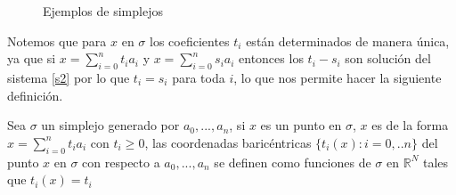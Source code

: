\begin{figure}[h]
\centering
{}
\caption{Ejemplos de simplejos}
\end{figure}

Notemos que para $x$ en $\sigma$ los coeficientes $t_i$ están determinados de manera única, ya que si $x = \sum_{i=0}^{n}t_ia_i$ y $x = \sum_{i=0}^{n}s_ia_i$ entonces los $t_i-s_i$ son solución del sistema \ref{s2} por lo que $t_i=s_i$ para toda $i$, lo que nos permite hacer la 
siguiente definición.
\begin{Defi}
Sea $\sigma$ un simplejo generado por $a_0,...,a_n$, si $x$ es un punto en $\sigma$, $x$ es de la forma $x = \sum_{i=0}^{n}t_ia_i$ con $t_i\geqslant 0$, las coordenadas baricéntricas $\{t_i(x):i = 0,..n\}$ del punto $x$ en $\sigma$ con respecto a $a_0,...,a_n$ se definen como funciones de $\sigma$ en $\mathbb{R}^{N}$ tales que $t_i(x) = t_i$
\end{Defi}

